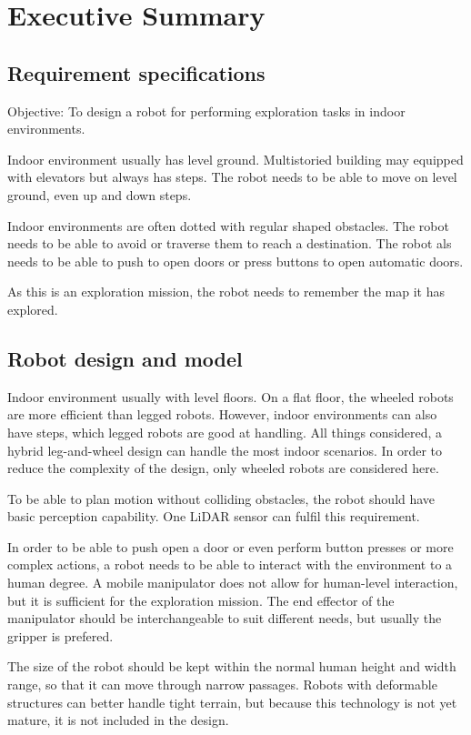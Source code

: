 \section{Executive Summary}


\subsection{Requirement specifications}

Objective: To design a robot for performing exploration tasks in indoor environments.

Indoor environment usually has level ground. Multistoried building may equipped with elevators but always has steps. The robot needs to be able to move on level ground, even up and down steps.

Indoor environments are often dotted with regular shaped obstacles. The robot needs to be able to avoid or traverse them to reach a destination. The robot als needs to be able to push to open doors or press buttons to open automatic doors.

As this is an exploration mission, the robot needs to remember the map it has explored.


\subsection{Robot design and model}

Indoor environment usually with level floors. On a flat floor, the wheeled robots are more efficient than legged robots. However, indoor environments can also have steps, which legged robots are good at handling. All things considered, a hybrid leg-and-wheel design can handle the most indoor scenarios. In order to reduce the complexity of the design, only wheeled robots are considered here.

To be able to plan motion without colliding obstacles, the robot should have basic perception capability. One LiDAR sensor can fulfil this requirement.

In order to be able to push open a door or even perform button presses or more complex actions, a robot needs to be able to interact with the environment to a human degree. A mobile manipulator does not allow for human-level interaction, but it is sufficient for the exploration mission. The end effector of the manipulator should be interchangeable to suit different needs, but usually the gripper is prefered.

The size of the robot should be kept within the normal human height and width range, so that it can move through narrow passages. Robots with deformable structures can better handle tight terrain, but because this technology is not yet mature, it is not included in the design.


